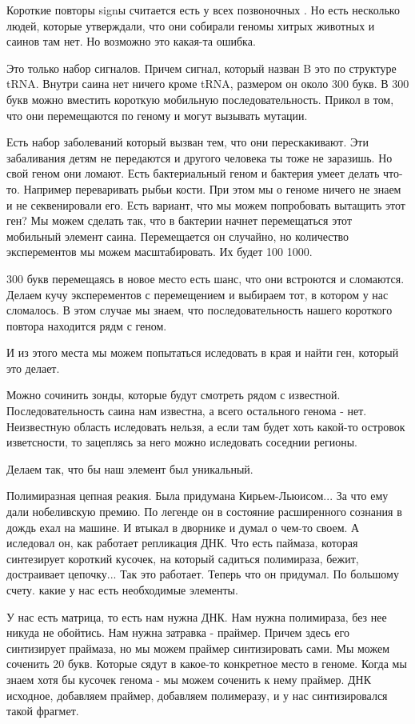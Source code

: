 Короткие повторы signы считается есть у всех позвоночных . Но есть несколько людей, 
которые утверждали, что они собирали геномы хитрых животных и саинов там нет. Но возможно это 
какая-та ошибка. 

Это только набор сигналов. Причем сигнал, который назван B это по структуре tRNA. Внутри саина нет
ничего кроме tRNA, размером он около 300 букв. В 300 букв можно вместить короткую
мобильную последовательность. Прикол в том, что они перемещаются по геному и могут вызывать мутации.

Есть набор заболеваний который вызван тем, что они перескакивают.
Эти забаливания детям не передаются и другого человека ты тоже не заразишь.
Но свой геном они ломают. Есть бактериальный геном и бактерия умеет делать что-то.
Например переваривать рыбьи кости. При этом мы о геноме ничего не знаем и не секвенировали его.
Есть вариант, что мы можем попробовать вытащить этот ген?
Мы можем сделать так, что в бактерии начнет перемещаться этот мобильный элемент саина.
Перемещается он случайно, но количество эксперементов мы можем
масштабировать. Их будет 100 1000.

300 букв перемещаясь в новое место есть шанс, что они встроются и
сломаются. Делаем кучу эксперементов с перемещением и выбираем тот,
в котором у нас сломалось. В этом случае мы знаем, что последовательность
нашего короткого повтора находится рядм с геном.

И из этого места мы можем попытаться иследовать в края и найти ген,
который это делает.

Можно сочинить зонды, которые будут смотреть рядом с известной. Последовательность
саина нам известна, а всего остального генома - нет. Неизвестную область иследовать нельзя,
а если там будет хоть какой-то островок изветсности, то зацеплясь за него можно
иследовать соседнии регионы.

Делаем так, что бы наш элемент был  уникальный.

Полимиразная цепная реакия. Была придумана Кирьем-Льюисом... За что ему дали
нобеливскую премию. По легенде
он в состояние расширенного сознания в дождь ехал на машине.
И втыкал в дворнике и думал о чем-то своем. А иследовал он, как
работает репликация ДНК. Что есть паймаза, которая
синтезирует короткий кусочек, на который садиться полимираза,
бежит, достраивает цепочку... Так это работает. Теперь что
он придумал. По большому счету. какие
у нас есть необходимые элементы.

У нас есть матрица, то есть нам нужна ДНК. Нам нужна полимираза,
без нее никуда не обойтись. Нам нужна затравка - праймер. Причем здесь
его синтизирует праймаза, но мы можем праймер синтизировать сами.
Мы можем соченить 20 букв. Которые сядут в какое-то конкретное место в
геноме. Когда мы знаем хотя бы кусочек генома - мы можем
соченить к нему праймер. ДНК исходное, добавляем праймер,
добавляем полимеразу, и у нас синтизировался такой фрагмет. 

